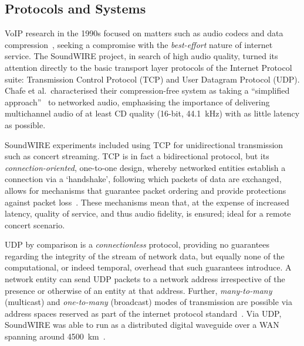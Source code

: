 \subsection{Protocols and Systems}\label{subsec:protocols-and-systems}

VoIP research in the 1990s focused on matters such as audio codecs and data
compression~\citep{turletti_inria_1995,hardman_successful_1998}, seeking a
compromise with the \textit{best-effort} nature of internet service.
The SoundWIRE project, in search of high audio quality, turned its attention
directly to the basic transport layer protocols of the Internet Protocol suite:
Transmission Control Protocol (TCP) and User Datagram Protocol (UDP).
Chafe et al.\ characterised their compression-free system as taking a
``simplified approach''~\citep{chafe_simplified_2000} to networked audio,
emphasising the importance of delivering multichannel audio of at least CD
quality (16-bit, \qty{44.1}{\kHz}) with as little latency as possible.

SoundWIRE experiments included using TCP for unidirectional transmission such as
concert streaming.
TCP is in fact a bidirectional protocol, but its \textit{connection-oriented},
one-to-one design, whereby networked entities establish a connection via a
`handshake', following which packets of data are exchanged, allows for
mechanisms that guarantee packet ordering and provide protections against packet
loss~\citep{schiavoni_alternatives_2013,al-dhief_performance_2018}.
These mechanisms mean that, at the expense of increased latency, quality of
service, and thus audio fidelity, is ensured; ideal for a remote concert
scenario.

UDP by comparison is a \textit{connectionless} protocol, providing no guarantees
regarding the integrity of the stream of network data, but equally none of the
computational, or indeed temporal, overhead that such guarantees introduce.
A network entity can send UDP packets to a network address irrespective of
the presence or otherwise of an entity at that address.
Further, \textit{many-to-many} (multicast) and \textit{one-to-many} (broadcast)
modes of transmission are possible via address spaces reserved as part of the
internet protocol standard~\citep{meyer_iana_2010}.
Via UDP, SoundWIRE was able to run as a distributed digital waveguide over a
WAN spanning around \qty{4500}{\km}~\citep{chafe_simplified_2000}.

